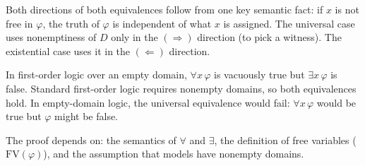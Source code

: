 \begin{remark*}
Both directions of both equivalences follow from one key semantic fact: if $x$
is not free in $\varphi$, the truth of $\varphi$ is independent of what $x$ is
assigned. The universal case uses nonemptiness of $D$ only in the
$(\Rightarrow)$ direction (to pick a witness). The existential case uses it in
the $(\Leftarrow)$ direction.
\end{remark*}

\begin{remark*}
In first-order logic over an empty domain, $\forall x\,\varphi$ is vacuously
true but $\exists x\,\varphi$ is false. Standard first-order logic requires
nonempty domains, so both equivalences hold. In empty-domain logic, the
universal equivalence would fail: $\forall x\,\varphi$ would be true but
$\varphi$ might be false.
\end{remark*}

\begin{remark*}[Dependencies]
The proof depends on: the semantics of $\forall$ and $\exists$, the definition
of free variables ($\mathrm{FV}(\varphi)$), and the assumption that models have
nonempty domains.
\end{remark*}
